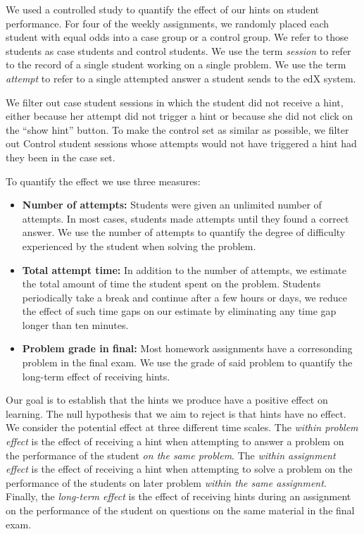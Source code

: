 \documentclass{llncs2e/llncs}
\begin{document}
We used a controlled study to quantify the effect of our hints on
student performance. For four of the weekly assignments, we randomly
placed each student with equal odds into a case group or a control
group. We refer to those students as case students and control
students.  We use the term {\em session} to refer to the record of a
single student working on a single problem. We use the term {\em
  attempt} to refer to a single attempted answer a student sends to
the edX system.

We filter out case student sessions in which the student did not
receive a hint, either because her attempt did not trigger a hint or
because she did not click on the ``show hint'' button.  To make the
control set as similar as possible, we filter out Control student
sessions whose attempts would not have triggered a hint had they been
in the case set.

To quantify the effect we use three measures:
\begin{itemize}
\item {\bf Number of attempts:} Students were given an unlimited number of attempts. In most cases, students made attempts until they found a correct answer. We use the number of attempts to quantify the degree of difficulty experienced by the student when solving the problem.

\item {\bf Total attempt time:} In addition to the number of attempts, we estimate the total amount of time the student spent on the problem. Students periodically take a break and continue after a few hours or days, we reduce the effect of such time gaps on our estimate by eliminating any time gap longer than ten minutes.
\item {\bf Problem grade in final:} Most homework assignments have a corresonding problem in the final exam. We use the grade of said problem to quantify the long-term effect of receiving hints. 
\end{itemize}

Our goal is to establish that the hints we produce have a positive
effect on learning. The null hypothesis that we aim to reject is that
hints have no effect. We consider the potential effect at three
different time scales. The {\em within problem effect} is the effect
of receiving a hint when attempting to answer a problem on the
performance of the student {\em on the same problem}. The {\em within
  assignment effect} is the effect of receiving a hint when attempting
to solve a problem on the performance of the students on later problem
{\em within the same assignment}. Finally, the {\em long-term effect}
is the effect of receiving hints during an assignment on the
performance of the student on questions on the same material in the
final exam.
\end{document}
